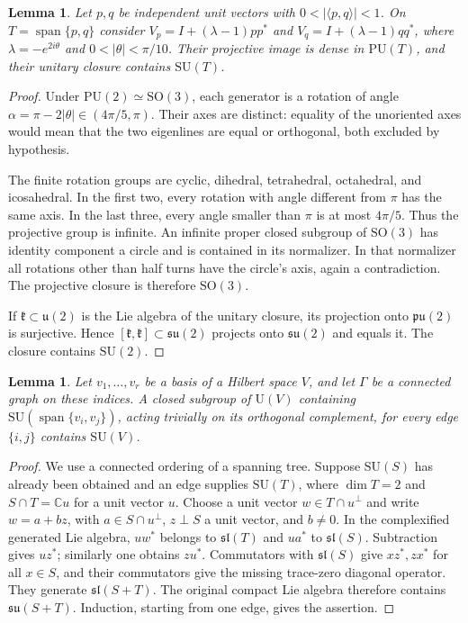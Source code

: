 \documentclass[11pt,a4paper]{article}
\newtheorem{lemma}[theorem]{Lemma}
\theoremstyle{remark}\newtheorem{remark}[theorem]{Remark}
\newcommand{\U}{\mathrm U}
\newcommand{\SU}{\mathrm {SU}}
\newcommand{\PU}{\mathrm {PU}}
\newcommand{\su}{\mathfrak {su}}
\newcommand{\slie}{\mathfrak {sl}}
\newcommand{\C}{\mathbb C}
\newcommand{\Span}{\operatorname{span}}
\begin{document}
\begin{lemma}\label{lem:two}
Let $p,q$ be independent unit vectors with
$0<|\langle p,q\rangle|<1$.  On $T=\Span\{p,q\}$ consider
$V_p=I+(\lambda-1)pp^*$ and $V_q=I+(\lambda-1)qq^*$, where
$\lambda=-e^{2i\theta}$ and $0<|\theta|<\pi/10$.
Their projective image is dense in $\PU(T)$, and their unitary closure
contains $\SU(T)$.
\end{lemma}
\begin{proof}
Under $\PU(2)\simeq\mathrm{SO}(3)$, each generator is a rotation of
angle $\alpha=\pi-2|\theta|\in(4\pi/5,\pi)$.  Their axes are distinct:
equality of the unoriented axes would mean that the two eigenlines are
equal or orthogonal, both excluded by hypothesis.

The finite rotation groups are cyclic, dihedral, tetrahedral, octahedral,
and icosahedral.  In the first two, every rotation with angle different
from $\pi$ has the same axis.  In the last three, every angle smaller
than $\pi$ is at most $4\pi/5$.  Thus the projective group is infinite.
An infinite proper closed subgroup of $\mathrm{SO}(3)$ has identity
component a circle and is contained in its normalizer.  In that normalizer
all rotations other than half turns have the circle's axis, again a
contradiction.  The projective closure is therefore $\mathrm{SO}(3)$.

If $\mathfrak k\subset\mathfrak u(2)$ is the Lie algebra of the unitary
closure, its projection onto $\mathfrak{pu}(2)$ is surjective.  Hence
$[\mathfrak k,\mathfrak k]\subset\su(2)$ projects onto $\su(2)$ and
equals it.  The closure contains $\SU(2)$.
\end{proof}

\begin{lemma}\label{lem:fusion}
Let $v_1,\ldots,v_r$ be a basis of a Hilbert space $V$, and let $\Gamma$
be a connected graph on these indices.  A closed subgroup of $\U(V)$
containing $\SU(\Span\{v_i,v_j\})$, acting trivially on its orthogonal
complement, for every edge $\{i,j\}$ contains $\SU(V)$.
\end{lemma}
\begin{proof}
We use a connected ordering of a spanning tree.  Suppose $\SU(S)$ has
already been obtained and an edge supplies $\SU(T)$, where $\dim T=2$
and $S\cap T=\C u$ for a unit vector $u$.  Choose a unit vector
$w\in T\cap u^\perp$ and write $w=a+bz$, with $a\in S\cap u^\perp$,
$z\perp S$ a unit vector, and $b\ne0$.
In the complexified generated Lie algebra, $uw^*$ belongs to
$\slie(T)$ and $ua^*$ to $\slie(S)$.  Subtraction gives $uz^*$;
similarly one obtains $zu^*$.  Commutators with $\slie(S)$ give
$xz^*,zx^*$ for all $x\in S$, and their commutators give the missing
trace-zero diagonal operator.  They generate $\slie(S+T)$.
The original compact Lie algebra therefore contains $\su(S+T)$.
Induction, starting from one edge, gives the assertion.
\end{proof}
\end{document}
